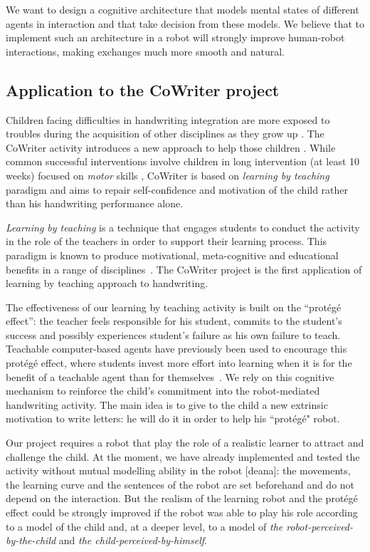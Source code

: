 \documentclass[10pt,a4paper,twocolumn]{article}
\begin{document}
We want to design a cognitive architecture that models mental states of different agents in interaction and that take decision from these models. We believe that to implement such an architecture in a robot will strongly improve human-robot interactions, making exchanges much more smooth and natural. 

\subsection{Application to the CoWriter project}
Children facing difficulties in handwriting integration are more exposed
to troubles during the acquisition of other disciplines as they grow up
\cite{Christensen2005}. 
The CoWriter activity introduces a new approach to help those children
\cite{Hood}. While common successful interventions involve children
in long intervention (at least 10 weeks) focused on \emph{motor} skills \cite{Hoy2011}, CoWriter is based on \emph{learning by teaching} paradigm and aims to repair self-confidence and motivation of the child rather than his handwriting performance alone.

\emph{Learning by teaching} is a technique that engages students to conduct the activity in the role of the teachers in order to support their learning process. This 
paradigm is known to produce motivational, meta-cognitive and educational
benefits in a range of disciplines~\cite{Rohrbeck2003}. The CoWriter project
is the first application of learning by teaching approach to handwriting. 

The effectiveness of our learning by teaching activity is built on the
``prot\'eg\'e effect'': the teacher feels responsible for his student, commits
to the student's success and possibly experiences student's failure as his own
failure to teach. Teachable computer-based agents have previously been used to
encourage this prot\'eg\'e effect, where students invest more effort into
learning when it is for the benefit of a teachable agent than for themselves~\cite{Chase2009}. We rely on this cognitive mechanism to reinforce the child's commitment into the
robot-mediated handwriting activity. The main idea is to give to the child a new extrinsic motivation to write letters: he will do it in order to help his ``prot\'eg\'e" robot.

Our project requires a robot that play the role of a realistic learner to attract and challenge the child. At the moment, we have already implemented and tested the activity without mutual modelling ability in the robot [deana]: the movements, the learning curve and the sentences of the robot are set beforehand and do not depend on the interaction. But the realism of the learning robot and the prot\'eg\'e effect could be strongly improved if the robot was able to play his role according to a model of the child and, at a deeper level, to a model of \textit{the robot-perceived-by-the-child} and \textit{the child-perceived-by-himself}.
\end{document}
